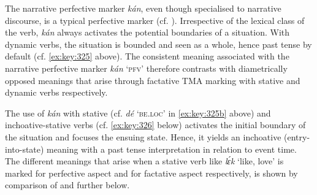 \ea%
    \label{ex:key:325}
\z
\z

The narrative perfective marker \textit{kán}, even though specialised to narrative discourse, is a typical perfective marker (cf. ). Irrespective of the lexical class of the verb, \textit{kán} always activates the potential boundaries of a situation. With dynamic verbs, the situation is bounded and seen as a whole, hence past tense by default (cf. \ref{ex:key:325} above). The consistent meaning associated with the narrative perfective marker \textit{kán} ‘\textsc{pfv’} therefore contrasts with diametrically opposed meanings that arise through factative TMA marking with stative and dynamic verbs respectively.


The use of \textit{kán} with stative (cf. \textit{dé} ‘\textsc{be.loc}’ in \ref{ex:key:325b} above) and inchoative-stative verbs (cf. \ref{ex:key:326} below) activates the initial boundary of the situation and focuses the ensuing state. Hence, it yields an inchoative (entry-into-state) meaning with a past tense interpretation in relation to event time. The different meanings that arise when a stative verb like \textit{lɛ́k} ‘like, love’ is marked for perfective aspect and for factative aspect respectively, is shown by comparison of  and  further below. 



